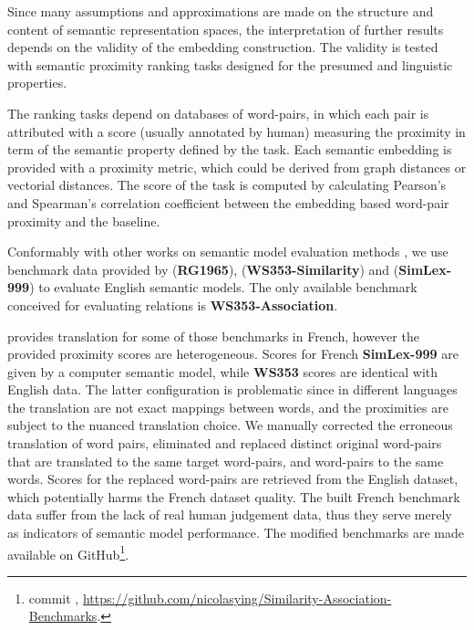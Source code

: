 Since many assumptions and approximations are made on the structure and content of semantic representation spaces, the interpretation of further results depends on the validity of the embedding construction. The validity is tested with semantic proximity ranking tasks designed for the presumed \similarity and \association linguistic properties.

The ranking tasks depend on databases of word-pairs, in which each pair is attributed with a score (usually annotated by human) measuring the proximity in term of the semantic property defined by the task. Each semantic embedding is provided with a proximity metric, which could be derived from graph distances or vectorial distances. The score of the task is computed by calculating Pearson's and Spearman's correlation coefficient  between the embedding based word-pair proximity and the baseline. 

Conformably with other works on semantic model evaluation methods \parencite{saediWordNetEmbeddings2018, jooheeComputationalStudyWord2017}, we use benchmark data provided by \textcite{rubensteinContextualCorrelatesSynonymy1965} (\textbf{RG1965}), \textcite{agirreStudySimilarityRelatedness2009} (\textbf{WS353-Similarity}) and \textcite{hillSimLex999EvaluatingSemantic2015} (\textbf{SimLex-999}) to evaluate English semantic \similarity models. The only available benchmark conceived for evaluating \association relations is \textbf{WS353-Association}.

\label{subsection:frenchbenchmarkdataconstruction}
\textcite{freitasSemanticRelatednessAll2016} provides translation for some of those benchmarks in French, however the provided proximity scores are heterogeneous. Scores for French \textbf{SimLex-999} are given by a computer semantic model, while \textbf{WS353} scores are identical with English data. The latter configuration is problematic since in different languages the translation are not exact mappings between words, and the proximities are subject to the nuanced translation choice. We manually corrected the erroneous translation of word pairs, eliminated and replaced distinct original word-pairs that are translated to the same target word-pairs, and word-pairs to the same words. Scores for the replaced word-pairs are retrieved from the English dataset, which potentially harms the French dataset quality. The built French benchmark data suffer from the lack of real human judgement data, thus they serve merely as indicators of semantic model performance. The modified benchmarks are made available on GitHub\footnote{commit , \url{https://github.com/nicolasying/Similarity-Association-Benchmarks}.}.


